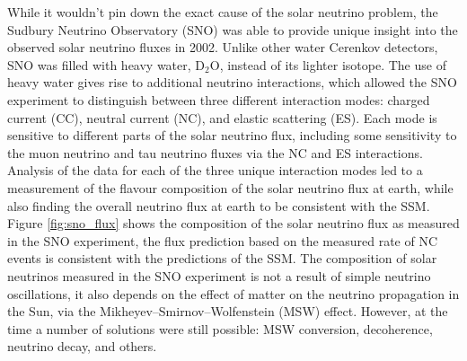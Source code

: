 While it wouldn't pin down the exact cause of the solar neutrino problem, the
Sudbury Neutrino Observatory (SNO) was able to provide unique insight into the 
observed solar neutrino fluxes in 2002. Unlike other water Cerenkov detectors, 
SNO was filled with heavy water, \(\mbox{D}_2\mbox{O}\), instead of its 
lighter isotope. The use of heavy water gives rise to additional neutrino 
interactions, which allowed the SNO experiment to distinguish between three 
different interaction modes: charged current (CC), neutral current (NC), and 
elastic scattering (ES). Each mode is sensitive to different parts of the 
solar neutrino flux, including some sensitivity to the muon neutrino and tau 
neutrino fluxes via the NC and ES interactions. Analysis of the data for each 
of the three unique interaction modes led to a measurement of the flavour 
composition of the solar neutrino flux at earth, while also finding the 
overall neutrino flux at earth to be consistent with the SSM.  Figure 
\ref{fig:sno_flux} shows the composition of the solar neutrino flux as 
measured in the SNO experiment\cite{Ahmad2002}, the flux prediction based on 
the measured rate of NC events is consistent with the predictions of the SSM. 
The composition of solar neutrinos measured in the SNO experiment is not a 
result of simple neutrino oscillations, it also depends on the effect of matter 
on the neutrino propagation in the Sun, via the Mikheyev–Smirnov–Wolfenstein 
(MSW) effect. However, at the time a number of solutions were still possible: 
MSW conversion, decoherence, neutrino decay, and others\cite{Smirnov:2016xzf}. 

